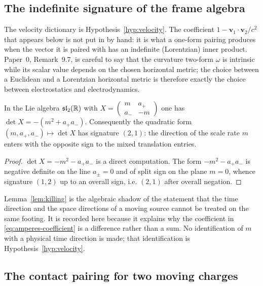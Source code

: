 \subsection{The indefinite signature of the frame algebra}

The velocity dictionary is Hypothesis~\ref{hyp:velocity}.  The coefficient
$1-\mathbf v_1\!\cdot\!\mathbf v_2/c^{2}$ that appears below is
not put in by hand: it is what a one-form pairing produces when the vector it is
paired with has an indefinite (Lorentzian) inner product.  Paper~0,
Remark~9.7, is careful to say that the curvature two-form $\omega$ is intrinsic
while its scalar value depends on the chosen horizontal metric; the choice
between a Euclidean and a Lorentzian horizontal metric is therefore exactly the
choice between electrostatics and electrodynamics.

\begin{lemma}
\label{lem:killing}
In the Lie algebra $\mathfrak{sl}_2(\mathbb{R})$ with
$X=\begin{pmatrix}m&a_+\\ a_-&-m\end{pmatrix}$ one has
$\det X=-(m^{2}+a_+a_-)$.  Consequently the quadratic form
$(m,a_+,a_-)\mapsto\det X$ has signature $(2,1)$: the direction of the scale
rate $m$ enters with the opposite sign to the mixed translation entries.
\end{lemma}

\begin{proof}
$\det X=-m^{2}-a_+a_-$ is a direct computation.  The form $-m^{2}-a_+a_-$ is
negative definite on the line $a_\pm=0$ and of split sign on the plane
$m=0$, whence signature $(1,2)$ up to an overall sign, i.e. $(2,1)$ after
overall negation.
\end{proof}

\begin{remark}
Lemma~\ref{lem:killing} is the algebraic shadow of the statement that the time
direction and the space directions of a moving source cannot be treated on the
same footing.  It is recorded here because it explains why the coefficient in
\eqref{eq:amperes-coefficient} is a difference rather than a sum.  No
identification of $m$ with a physical time direction is made; that identification
is Hypothesis~\ref{hyp:velocity}.
\end{remark}

\subsection{The contact pairing for two moving charges}

